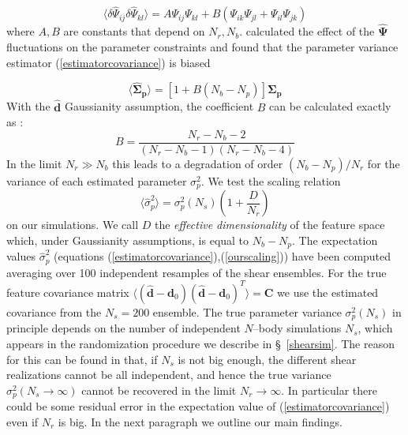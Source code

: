 \documentclass[reprint,aps,prd,superscriptaddress,showkeys,showpacs]{revtex4-1}
\newcommand{\bb}[1]{\mathbf{#1}}
\newcommand{\bbh}[1]{\mathbf{\hat{#1}}}
\newcommand{\h}[1]{\hat{#1}}
\begin{document}
\begin{equation}
\langle\delta\h{\Psi}_{ij}\delta\h{\Psi}_{kl}\rangle = A\Psi_{ij}\Psi_{kl} + B(\Psi_{ik}\Psi_{jl} + \Psi_{il}\Psi_{jk})
\end{equation}
%
where $A,B$ are constants that depend on $N_r,N_b$. \citep{DodelsonSchneider13} calculated the effect of the $\bbh{\Psi}$ fluctuations on the parameter constraints and found that the parameter variance estimator (\ref{estimatorcovariance}) is biased

\begin{equation}
\label{dodelsonscaling}
\langle\bbh{\Sigma}_\bb{p}\rangle = \left[1+B(N_b-N_p)\right]\bb{\Sigma}_\bb{p}
\end{equation} 
%
With the $\bbh{d}$ Gaussianity assumption, the coefficient $B$ can be calculated exactly as \citep{DodelsonSchneider13,Taylor12}:
\begin{equation}
B = \frac{N_r-N_b-2}{(N_r-N_b-1)(N_r-N_b-4)}
\end{equation}
%
In the limit $N_r\gg N_b$ this leads to a degradation of order $(N_b-N_p)/N_r$ for the variance of each estimated parameter $\sigma^2_p$. We test the scaling relation
\begin{equation}
\label{ourscaling}
\langle\h{\sigma}_p^2\rangle = \sigma^2_p(N_s)\left(1+\frac{D}{N_r}\right)
\end{equation}
%
on our simulations. We call $D$ the \textit{effective dimensionality} of the feature space which, under Gaussianity assumptions, is equal to $N_b-N_p$. The expectation values $\h{\sigma}^2_p$ (equations (\ref{estimatorcovariance}),(\ref{ourscaling})) have been computed averaging over 100 independent resamples of the shear ensembles. For the true feature covariance matrix $\langle(\bbh{d}-\bb{d}_0)(\bbh{d}-\bb{d}_0)^T\rangle=\bb{C}$ we use the estimated covariance from the $N_s=200$ ensemble. 
The true parameter variance $\sigma^2_p(N_s)$ in principle depends on the number of independent $N$--body simulations $N_s$, which appears in the randomization procedure we describe in \S~\ref{shearsim}. The reason for this can be found in that, if $N_s$ is not big enough, the different shear realizations cannot be all independent, and hence the true variance $\sigma^2_p(N_s\rightarrow\infty)$ cannot be recovered in the limit $N_r\rightarrow\infty$. In particular there could be some residual error in the expectation value of (\ref{estimatorcovariance}) even if $N_r$ is big. In the next paragraph we outline our main findings.
 

\end{document}
